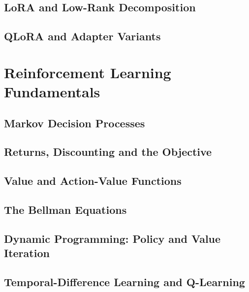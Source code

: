 \subsection{LoRA and Low-Rank Decomposition}


\subsection{QLoRA and Adapter Variants}

\section{Reinforcement Learning Fundamentals}
\label{sec:rl}


\subsection{Markov Decision Processes}

\subsection{Returns, Discounting and the Objective}

\subsection{Value and Action-Value Functions}

\subsection{The Bellman Equations}

\subsection{Dynamic Programming: Policy and Value Iteration}

\subsection{Temporal-Difference Learning and Q-Learning}

